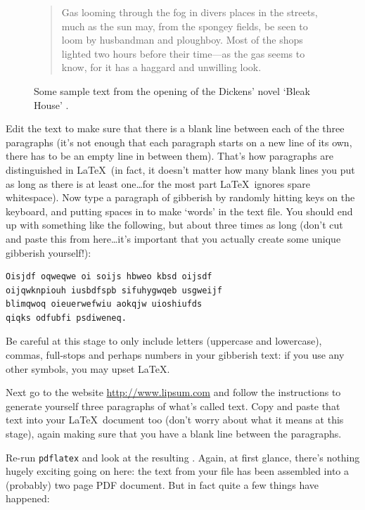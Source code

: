 \begin{refsection}
\begin{figure}[tbp]
\begin{quote}
Gas looming through the fog in divers places in the streets, much as
the sun may, from the spongey fields, be seen to loom by husbandman
and ploughboy. Most of the shops lighted two hours before their
time---as the gas seems to know, for it has a haggard and unwilling
look.

\end{quote}

\caption{Some sample text from the opening of the Dickens' novel `Bleak House' \citep{dickens1852}.}\label{figure:bleakhouse}
\end{figure}

Edit the text to make sure that there is a blank line between each of the three paragraphs (it's not enough that each paragraph starts on a new line of its own, there has to be an empty line in between them). That's how paragraphs are distinguished in \LaTeX\ (in fact, it doesn't matter how many blank lines you put as long as there is at least one\ldots for the most part \LaTeX\ ignores spare whitespace). Now type a paragraph of gibberish by randomly hitting keys on the keyboard, and putting spaces in to make `words' in the text file. You should end up with something like the following, but about three times as long (don't cut and paste this from here\ldots it's important that you actually create some unique gibberish yourself!):

\begin{verbatim}
Oisjdf oqweqwe oi soijs hbweo kbsd oijsdf 
oijqwknpiouh iusbdfspb sifuhygwqeb usgweijf 
blimqwoq oieuerwefwiu aokqjw uioshiufds 
qiqks odfubfi psdiweneq.
\end{verbatim}

Be careful at this stage to only include letters (uppercase and lowercase), commas, full-stops and perhaps numbers in your gibberish text: if you use any other symbols, you may upset \LaTeX. 

Next go to the website \href{http://www.lipsum.com/}{http://www.lipsum.com} and follow the instructions to generate yourself three paragraphs of what's called  text. Copy and paste that text into your \LaTeX\ document too (don't worry about what it means at this stage), again making sure that you have a blank line between the paragraphs.

Re-run \texttt{pdflatex} and look at the resulting . Again, at first glance, there's nothing hugely exciting going on here: the text from your  file has been assembled into a (probably) two page PDF document. But in fact quite a few things have happened: 


\end{refsection}
